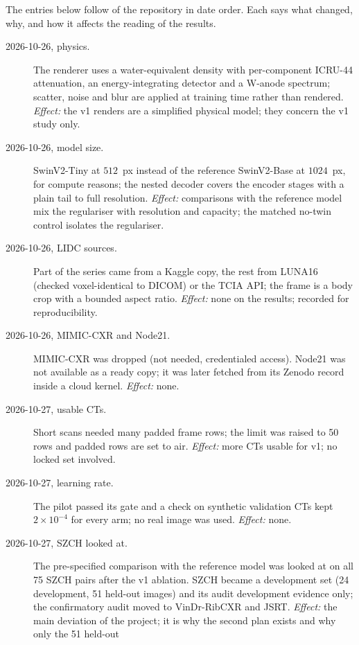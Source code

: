 The entries below follow  of the repository in date order. Each says what changed, why, and how it affects the reading of
the results.
\begin{description}
\item[2026-10-26, physics.] The renderer uses a water-equivalent density with per-component ICRU-44 attenuation, an energy-integrating
 detector and a W-anode spectrum; scatter, noise and blur are applied at training time rather than rendered. \emph{Effect:} the v1 renders are a
 simplified physical model; they concern the v1 study only.
\item[2026-10-26, model size.] SwinV2-Tiny at $512$~px instead of the reference SwinV2-Base at $1024$~px, for compute reasons; the nested
 decoder covers the encoder stages with a plain tail to full resolution. \emph{Effect:} comparisons with the reference model mix the
 regulariser with resolution and capacity; the matched no-twin control isolates the regulariser.
\item[2026-10-26, LIDC sources.] Part of the series came from a Kaggle copy, the rest from LUNA16 (checked voxel-identical to DICOM) or the TCIA
 API; the frame is a body crop with a bounded aspect ratio. \emph{Effect:} none on the results; recorded for reproducibility.
\item[2026-10-26, MIMIC-CXR and Node21.] MIMIC-CXR was dropped (not needed, credentialed access). Node21 was not available as a ready copy;
 it was later fetched from its Zenodo record inside a cloud kernel. \emph{Effect:} none.
\item[2026-10-27, usable CTs.] Short scans needed many padded frame rows; the limit was raised to 50 rows and padded rows are set to air.
 \emph{Effect:} more CTs usable for v1; no locked set involved.
\item[2026-10-27, learning rate.] The pilot passed its gate and a check on synthetic validation CTs kept $2\times10^{-4}$ for every arm; no real
 image was used. \emph{Effect:} none.
\item[2026-10-27, SZCH looked at.] The pre-specified comparison with the reference model was looked at on all 75 SZCH pairs after the v1
 ablation. SZCH became a development set (24 development, 51 held-out images) and its audit development evidence only; the confirmatory audit
 moved to VinDr-RibCXR and JSRT. \emph{Effect:} the main deviation of the project; it is why the second plan exists and why only the 51 held-out

\end{description}
